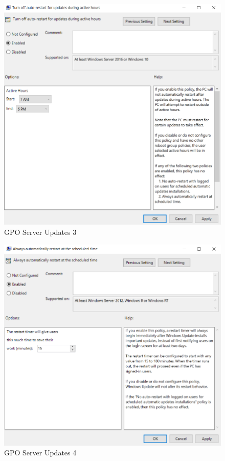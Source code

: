 \begin{minipage}{0.5\linewidth}
    \begin{figure}[H]
        \centering
        \includegraphics[width=\linewidth]{../img/Updates/client-auto-restart-during-working-hours.png}
        \caption{GPO Server Updates 3}
    \end{figure}
\end{minipage}
\begin{minipage}{0.5\linewidth}
    \begin{figure}[H]
        \centering
        \includegraphics[width=\linewidth]{../img/Updates/server-automatic-restart.png}
        \caption{GPO Server Updates 4}
    \end{figure}
\end{minipage}\\

